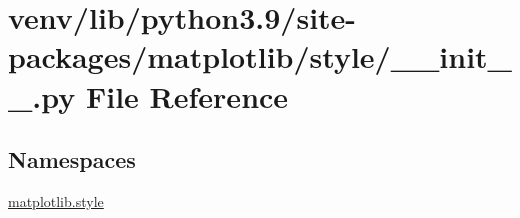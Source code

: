 \hypertarget{venv_2lib_2python3_89_2site-packages_2matplotlib_2style_2____init_____8py}{}\section{venv/lib/python3.9/site-\/packages/matplotlib/style/\+\_\+\+\_\+init\+\_\+\+\_\+.py File Reference}
\label{venv_2lib_2python3_89_2site-packages_2matplotlib_2style_2____init_____8py}
\subsection*{Namespaces}
\begin{DoxyCompactItemize}
\item 
 \hyperlink{namespacematplotlib_1_1style}{matplotlib.\+style}
\end{DoxyCompactItemize}
